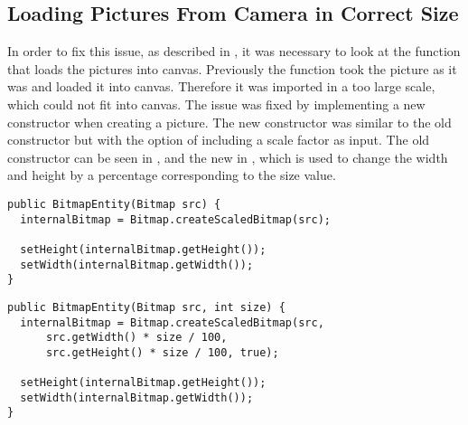 \subsection{Loading Pictures From Camera in Correct Size}
In order to fix this issue, as described in \secref{}, it was necessary to look at the function that loads the pictures into canvas.
Previously the function took the picture as it was and loaded it into canvas.
Therefore it was imported in a too large scale, which could not fit into canvas.
The issue was fixed by implementing a new constructor when creating a picture.
The new constructor was similar to the old constructor but with the option of including a scale factor as input.
The old constructor can be seen in , and the new in , which is used to change the width and height by a percentage corresponding to the size value.

\begin{lstlisting}[caption={Old Constructor}, label=lst:BitmapEnity-Constructor-Old, float=h]
public BitmapEntity(Bitmap src) {
  internalBitmap = Bitmap.createScaledBitmap(src);
  
  setHeight(internalBitmap.getHeight());
  setWidth(internalBitmap.getWidth());
}
\end{lstlisting}

\begin{lstlisting}[caption={New Constructor}, label=lst:BitmapEnity-Constructor-New, float=h]
public BitmapEntity(Bitmap src, int size) {
  internalBitmap = Bitmap.createScaledBitmap(src, 
      src.getWidth() * size / 100, 
      src.getHeight() * size / 100, true);
  
  setHeight(internalBitmap.getHeight());
  setWidth(internalBitmap.getWidth());
}
\end{lstlisting}